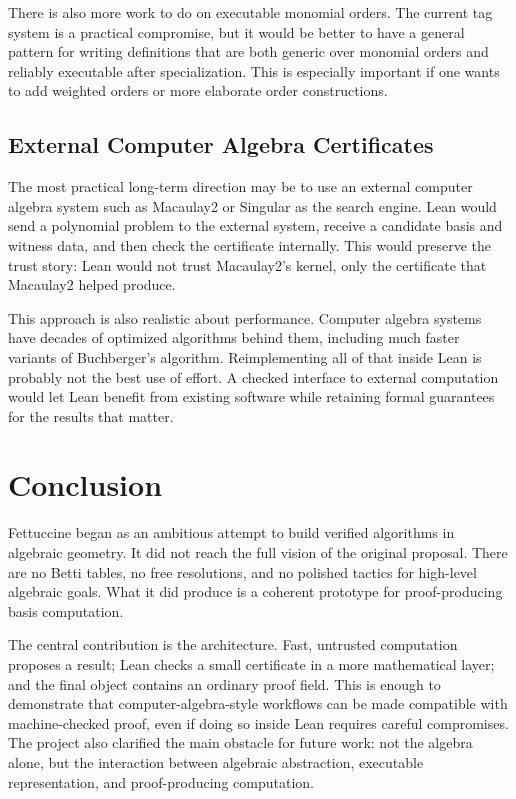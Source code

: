 \documentclass[acmsmall,nonacm,screen]{acmart}
\begin{document}
There is also more work to do on executable monomial orders.
The current tag system is a practical compromise, but it would be better to have a general pattern
for writing definitions that are both generic over monomial orders and reliably executable after
specialization.
This is especially important if one wants to add weighted orders or more elaborate order
constructions.

\subsection{External Computer Algebra Certificates}

The most practical long-term direction may be to use an external computer algebra system such as
Macaulay2 or Singular as the search engine.
Lean would send a polynomial problem to the external system, receive a candidate basis and witness
data, and then check the certificate internally.
This would preserve the trust story: Lean would not trust Macaulay2's kernel, only the certificate
that Macaulay2 helped produce.

This approach is also realistic about performance.
Computer algebra systems have decades of optimized algorithms behind them, including much faster
variants of Buchberger's algorithm.
Reimplementing all of that inside Lean is probably not the best use of effort.
A checked interface to external computation would let Lean benefit from existing software while
retaining formal guarantees for the results that matter.

\section{Conclusion}

Fettuccine began as an ambitious attempt to build verified algorithms in algebraic geometry.
It did not reach the full vision of the original proposal.
There are no Betti tables, no free resolutions, and no polished tactics for high-level algebraic
goals.
What it did produce is a coherent prototype for proof-producing \Groebner{} basis computation.

The central contribution is the architecture.
Fast, untrusted computation proposes a result; Lean checks a small certificate in a more
mathematical layer; and the final object contains an ordinary proof field.
This is enough to demonstrate that computer-algebra-style workflows can be made compatible with
machine-checked proof, even if doing so inside Lean requires careful compromises.
The project also clarified the main obstacle for future work: not the algebra alone, but the
interaction between algebraic abstraction, executable representation, and proof-producing
computation.



\end{document}
